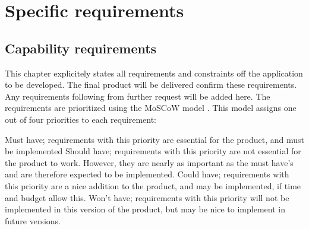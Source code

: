 \chapter{Specific requirements}
\section{Capability requirements}
This chapter explicitely states all requirements and constraints off the application to be developed. The final product will be delivered confirm these requirements. Any requirements following from further request will be added here.
The requirements are prioritized using the MoSCoW model \cite{website:moscow}. This model assigns one out of four priorities to each requirement:

Must have; requirements with this priority are essential for the product, and must be implemented
Should have; requirements with this priority are not essential for the product to work. However, they are nearly as important as the must have's and are therefore expected to be implemented.
Could have; requirements with this priority are a nice addition to the product, and may be implemented, if time and budget allow this.
Won't have; requirements with this priority will not be implemented in this version of the product, but may be nice to implement in future versions.


